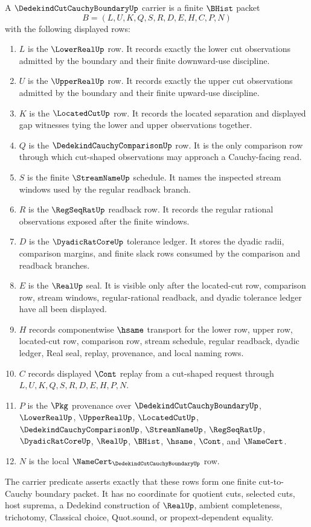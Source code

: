 \begin{definition}
\label{def:dedekind-cut-cauchy-boundary-carrier}
A $\DedekindCutCauchyBoundaryUp$ carrier is a finite $\BHist$ packet
$$
B=(L,U,K,Q,S,R,D,E,H,C,P,N)
$$
with the following displayed rows:
\begin{enumerate}
\item $L$ is the $\LowerRealUp$ row. It records exactly the lower cut observations admitted by the boundary and their finite downward-use discipline.
\item $U$ is the $\UpperRealUp$ row. It records exactly the upper cut observations admitted by the boundary and their finite upward-use discipline.
\item $K$ is the $\LocatedCutUp$ row. It records the located separation and displayed gap witnesses tying the lower and upper observations together.
\item $Q$ is the $\DedekindCauchyComparisonUp$ row. It is the only comparison row through which cut-shaped observations may approach a Cauchy-facing read.
\item $S$ is the finite $\StreamNameUp$ schedule. It names the inspected stream windows used by the regular readback branch.
\item $R$ is the $\RegSeqRatUp$ readback row. It records the regular rational observations exposed after the finite windows.
\item $D$ is the $\DyadicRatCoreUp$ tolerance ledger. It stores the dyadic radii, comparison margins, and finite slack rows consumed by the comparison and readback branches.
\item $E$ is the $\RealUp$ seal. It is visible only after the located-cut row, comparison row, stream windows, regular-rational readback, and dyadic tolerance ledger have all been displayed.
\item $H$ records componentwise $\hsame$ transport for the lower row, upper row, located-cut row, comparison row, stream schedule, regular readback, dyadic ledger, Real seal, replay, provenance, and local naming rows.
\item $C$ records displayed $\Cont$ replay from a cut-shaped request through $L,U,K,Q,S,R,D,E,H,P,N$.
\item $P$ is the $\Pkg$ provenance over $\DedekindCutCauchyBoundaryUp$, $\LowerRealUp$, $\UpperRealUp$, $\LocatedCutUp$, $\DedekindCauchyComparisonUp$, $\StreamNameUp$, $\RegSeqRatUp$, $\DyadicRatCoreUp$, $\RealUp$, $\BHist$, $\hsame$, $\Cont$, and $\NameCert$.
\item $N$ is the local $\NameCert_{\DedekindCutCauchyBoundaryUp}$ row.
\end{enumerate}
The carrier predicate asserts exactly that these rows form one finite cut-to-Cauchy boundary packet. It has no coordinate for quotient cuts, selected cuts, host suprema, a Dedekind construction of $\RealUp$, ambient completeness, trichotomy, Classical choice, Quot.sound, or propext-dependent equality.
\end{definition}
